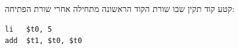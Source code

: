 

קטע קוד תקין שבו שורת הקוד הראשונה מתחילה אחרי שורת הפתיחה:
\begin{asmblock}
\begin{lstlisting}[style=asm]
li   $t0, 5
add  $t1, $t0, $t0
\end{lstlisting}
\end{asmblock}

